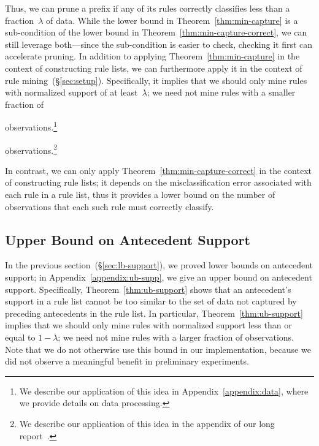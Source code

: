 \documentclass[twoside,11pt]{article}
\def\Reg{{\lambda}}
\begin{document}
Thus, we can prune a prefix if any of its rules correctly classifies
less than a fraction~$\Reg$ of data.
%
While the lower bound in Theorem~\ref{thm:min-capture} is a sub-condition
of the lower bound in Theorem~\ref{thm:min-capture-correct},
we can still leverage both---since the sub-condition is easier to check,
checking it first can accelerate pruning.
%
In addition to applying Theorem~\ref{thm:min-capture} in the context of
constructing rule lists, we can furthermore apply it in the context of
rule mining~(\S\ref{sec:setup}).
%
Specifically, it implies that we should only mine rules with
normalized support of at least~$\Reg$;
we need not mine rules with a smaller fraction of
\begin{arxiv}
observations.\footnote{We describe our application of this idea in
Appendix~\ref{appendix:data}, where we provide details on data processing.}
\end{arxiv}
\begin{kdd}
observations.\footnote{We describe our application of this idea in the appendix
of our long report~\citep{AngelinoLaAlSeRu17}.}
\end{kdd}
%
In contrast, we can only apply Theorem~\ref{thm:min-capture-correct}
in the context of constructing rule lists;
it depends on the misclassification error associated with each
rule in a rule list, thus it provides a lower bound on the number of
observations that each such rule must correctly classify.

\begin{arxiv}
\subsection{Upper Bound on Antecedent Support}
\label{sec:ub-support}

In the previous section~(\S\ref{sec:lb-support}), we proved lower bounds on
antecedent support; in Appendix~\ref{appendix:ub-supp},
we give an upper bound on antecedent support.
%
Specifically, Theorem~\ref{thm:ub-support} shows that an antecedent's
support in a rule list cannot be too similar to the set of data not
captured by preceding antecedents in the rule list.
%
In particular, Theorem~\ref{thm:ub-support} implies that we should
only mine rules with normalized support less than or equal to ${1 - \Reg}$;
we need not mine rules with a larger fraction of observations.
%
Note that we do not otherwise use this bound in our implementation,
because we did not observe a meaningful benefit in preliminary experiments.
\end{arxiv}
\end{document}
